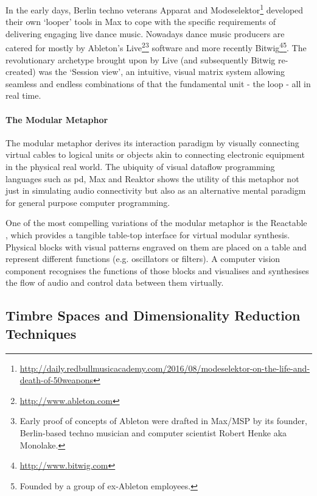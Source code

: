 In the early days, Berlin techno veterans Apparat and Modeselektor\footnote{\url{http://daily.redbullmusicacademy.com/2016/08/modeselektor-on-the-life-and-death-of-50weapons}} developed their own `looper' tools in Max to cope with the specific requirements of delivering engaging live dance music. Nowadays dance music producers are catered for mostly by Ableton's Live\footnote{\url{http://www.ableton.com}}\footnote{Early proof of concepts of Ableton were drafted in Max/MSP by its founder, Berlin-based techno musician and computer scientist Robert Henke aka Monolake.} software and more recently Bitwig\footnote{\url{http://www.bitwig.com}}\footnote{Founded by a group of ex-Ableton employees.}. The revolutionary archetype brought upon by Live (and subsequently Bitwig re-created) was the `Session view', an intuitive, visual matrix system allowing seamless and endless combinations of that the fundamental unit - the loop - all in real time.

\paragraph{The Modular Metaphor}

The modular metaphor derives its interaction paradigm by visually connecting virtual cables to logical units or objects akin to connecting electronic equipment in the physical real world. The ubiquity of visual dataflow programming languages such as \acrshort{pd}, Max and Reaktor shows the utility of this metaphor not just in simulating audio connectivity but also as an alternative mental paradigm for general purpose computer programming.

One of the most compelling variations of the modular metaphor is the Reactable \citep{Jorda2005}, which provides a tangible table-top interface for virtual modular synthesis. Physical blocks with visual patterns engraved on them are placed on a table and represent different functions (e.g. oscillators or filters). A computer vision component recognises the functions of those blocks and visualises and synthesises the flow of audio and control data between them virtually. 

\subsection{Timbre Spaces and Dimensionality Reduction Techniques}

